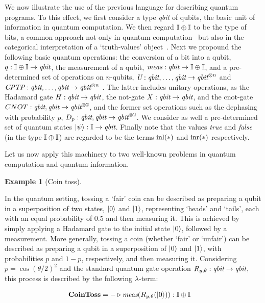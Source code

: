 \documentclass[10pt,a4paper]{amsart}
\theoremstyle{definition}
\theoremstyle{definition}
\newtheorem{example}[definition]{Example}
\theoremstyle{definition}
\theoremstyle{definition}
\theoremstyle{definition}
\theoremstyle{definition}
\begin{document}
We now illustrate the use of the previous language for describing quantum
programs. To this effect, we first consider a type \emph{qbit} of qubits, the
basic unit of information in quantum computation. We then regard $\mathbb{I} \oplus
\mathbb{I}$ to be the type of bits, a common approach not only in quantum
computation~\cite{selinger04} but also in the categorical interpretation of a
`truth-values' object~\cite{johnstone02,cho15}. Next we propound the following
basic quantum operations:  the conversion of a bit into a qubit, $q : \mathbb{I}
\oplus \mathbb{I}  \to \emph{qbit}$, the measurement of a qubit,
$\emph{meas}:\emph{qbit} \to \mathbb{I} \oplus \mathbb{I}$, and a pre-determined set of
operations on $n$-qubits, $\emph{U}:\emph{qbit},\ldots,\emph{qbit} \to
\emph{qbit}^{\otimes n}$ and $\emph{CPTP}:\emph{qbit},\ldots,\emph{qbit} \to
\emph{qbit}^{\otimes n}$ . The latter includes unitary operations, as the Hadamard
gate $H : \emph{qbit} \to \emph{qbit}$, the not-gate $X : \emph{qbit} \to
\emph{qbit}$, and the cnot-gate $CNOT : \emph{qbit},\emph{qbit} \to
\emph{qbit}^{\otimes 2}$, and the former set operations such as the dephasing with probability $p$, $D_p : \emph{qbit},\emph{qbit} \to
\emph{qbit}^{\otimes 2}$. We consider as well a pre-determined set of quantum
states $\ket{\psi} : \mathbb{I} \to \emph{qbit}$.  Finally note that the values
\emph{true} and \emph{false} (in the type $\mathbb{I} \oplus \mathbb{I}$) are regarded to be 
the terms $\mathrm{inl}(\ast)$ and $\mathrm{inr}(\ast)$ respectively.


Let us now apply this machinery to two well-known problems in quantum computation
and quantum information.

\begin{example}[Coin toss] \label{ex:coin_toss_syntax}



In the quantum setting, tossing a `fair' coin can be described as preparing a qubit in a superposition of two states, $\ket{0}$ and $\ket{1}$, representing `heads' and `tails', each with an equal probability of $0.5$ and then measuring it. This is achieved by simply applying a Hadamard gate to the initial state $\ket{0}$, followed by a measurement.
More generally, tossing a coin (whether `fair' or `unfair') can be described as preparing a qubit in a superposition of  $\ket{0}$ and $\ket{1}$, with probabilities $p$ and $1-p$, respectively,  and then measuring it.  Considering $p= \cos(\theta/2)^2$ and the standard quantum gate operation $R_{y,\theta} : \emph{qbit} \to \emph{qbit}$,  this process is described by the following $\lambda$-term:

\begin{align*}
  &\textbf{CoinToss} = - \triangleright \emph{meas} (R_{y,\theta} (\ket{0})): \mathbb{I} \oplus \mathbb{I}
\end{align*}


\end{example}
\end{document}
